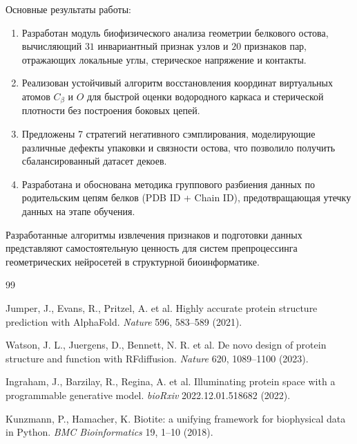 \documentclass[12pt, a4paper]{article}
\begin{document}
Основные результаты работы:
\begin{enumerate}
    \item Разработан модуль биофизического анализа геометрии белкового остова, вычисляющий $31$ инвариантный признак узлов и $20$ признаков пар, отражающих локальные углы, стерическое напряжение и контакты.
    \item Реализован устойчивый алгоритм восстановления координат виртуальных атомов $C_\beta$ и $O$ для быстрой оценки водородного каркаса и стерической плотности без построения боковых цепей.
    \item Предложены 7 стратегий негативного сэмплирования, моделирующие различные дефекты упаковки и связности остова, что позволило получить сбалансированный датасет декоев.
    \item Разработана и обоснована методика группового разбиения данных по родительским цепям белков (PDB ID + Chain ID), предотвращающая утечку данных на этапе обучения.
\end{enumerate}

Разработанные алгоритмы извлечения признаков и подготовки данных представляют самостоятельную ценность для систем препроцессинга геометрических нейросетей в структурной биоинформатике.

\newpage

\begin{thebibliography}{99}

Jumper, J., Evans, R., Pritzel, A. et al. Highly accurate protein structure prediction with AlphaFold. \textit{Nature} 596, 583–589 (2021).

Watson, J. L., Juergens, D., Bennett, N. R. et al. De novo design of protein structure and function with RFdiffusion. \textit{Nature} 620, 1089–1100 (2023).

Ingraham, J., Barzilay, R., Regina, A. et al. Illuminating protein space with a programmable generative model. \textit{bioRxiv} 2022.12.01.518682 (2022).

Kunzmann, P., Hamacher, K. Biotite: a unifying framework for biophysical data in Python. \textit{BMC Bioinformatics} 19, 1–10 (2018).

\end{thebibliography}
\end{document}
